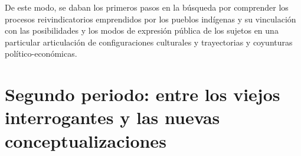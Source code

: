 \documentclass{tufte-handout}
\begin{document}
De este modo, se daban los primeros pasos en la búsqueda por comprender
los procesos reivindicatorios emprendidos por los pueblos indígenas y su
vinculación con las posibilidades y los modos de expresión pública de
los sujetos en una particular articulación de configuraciones culturales
y trayectorias y coyunturas político-económicas.

\hypertarget{segundo-periodo-entre-los-viejos-interrogantes-y-las-nuevas-conceptualizaciones}{%
\section{Segundo periodo: entre los viejos interrogantes y las nuevas\\\noindent
conceptualizaciones}\label{segundo-periodo-entre-los-viejos-interrogantes-y-las-nuevas-conceptualizaciones}}
\end{document}
